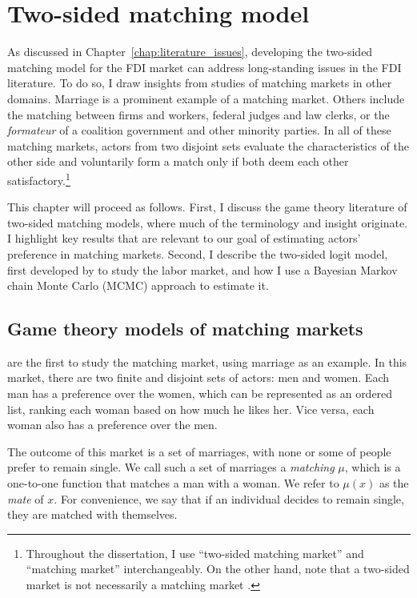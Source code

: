 \chapter{Two-sided matching model}
\label{chap:model}

As discussed in Chapter~\ref{chap:literature_issues}, developing the two-sided
matching model for the FDI market can address long-standing issues in the FDI
literature. To do so, I draw insights from studies of matching markets in other
domains. Marriage is a prominent example of a matching market. Others include
the matching between firms and workers, federal judges and law clerks, or the
\textit{formateur} of a coalition government and other minority parties. In all
of these matching markets, actors from two disjoint sets evaluate the
characteristics of the other side and voluntarily form a match only if both deem
each other satisfactory.\footnote{Throughout the dissertation, I use ``two-sided
  matching market'' and ``matching market'' interchangeably. On the other hand,
  note that a two-sided market is not necessarily a matching market
  \citep{Rysman2009}.}

This chapter will proceed as follows. First, I discuss the game theory
literature of two-sided matching models, where much of the terminology and
insight originate. I highlight key results that are relevant to our goal of
estimating actors' preference in matching markets. Second, I describe the
two-sided logit model, first developed by \citet{Logan1996} to study the labor
market, and how I use a Bayesian Markov chain Monte Carlo (MCMC) approach to
estimate it.

\section{Game theory models of matching markets}
\label{sec:game_theory}

\citet{Gale1962} are the first to study the matching market, using marriage as
an example. In this market, there are two finite and disjoint sets of actors:
men and women. Each man has a preference over the women, which can be
represented as an ordered list, ranking each woman based on how much he likes
her. Vice versa, each woman also has a preference over the men.

The outcome of this market is a set of marriages, with none or some of people
prefer to remain single. We call such a set of marriages a \textit{matching}
$\mu$, which is a one-to-one function that matches a man with a woman. We refer
to $\mu(x)$ as the \textit{mate} of $x$. For convenience, we say that if an
individual decides to remain single, they are matched with themselves.

